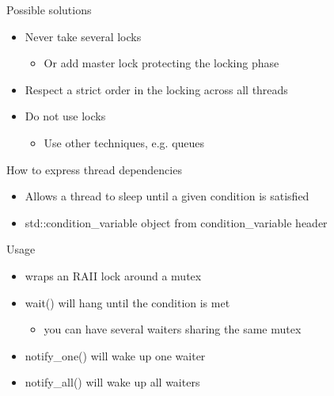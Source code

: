 \begin{frame}[fragile]
  \begin{block}{Possible solutions}
    \begin{itemize}
    \item Never take several locks
      \begin{itemize}
      \item Or add master lock protecting the locking phase
      \end{itemize}
    \item Respect a strict order in the locking across all threads
    \item Do not use locks
      \begin{itemize}
      \item Use other techniques, e.g. queues
      \end{itemize}
    \end{itemize}
  \end{block}
\end{frame}

\begin{frame}[fragile]
  \begin{block}{How to express thread dependencies}
    \begin{itemize}
    \item Allows a thread to sleep until a given condition is satisfied
    \item std::condition\_variable object from condition\_variable header
    \end{itemize}
  \end{block}
  \pause
  \begin{block}{Usage}
    \begin{itemize}
    \item wraps an RAII lock around a mutex
    \item wait() will hang until the condition is met
      \begin{itemize}
      \item you can have several waiters sharing the same mutex
      \end{itemize}
    \item notify\_one() will wake up one waiter
    \item notify\_all() will wake up all waiters
    \end{itemize}
  \end{block}
\end{frame}

